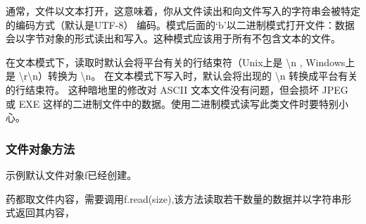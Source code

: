 \documentclass[UTF8]{ctexart}
\begin{document}
通常，文件以文本打开，这意味着，你从文件读出和向文件写入的字符串会被特定的编码方式（默认是UTF-8）
编码。模式后面的`b'以二进制模式打开文件：数据会以字节对象的形式读出和写入。这种模式应该用于所有不包含文本的文件。

在文本模式下，读取时默认会将平台有关的行结束符（Unix上是 \textbackslash n , Windows上是 \textbackslash r\textbackslash n）转换为 \textbackslash n。
在文本模式下写入时，默认会将出现的 \textbackslash n 转换成平台有关的行结束符。
这种暗地里的修改对 ASCII 文本文件没有问题，但会损坏 JPEG 或 EXE 这样的二进制文件中的数据。使用二进制模式读写此类文件时要特别小心。

\subsubsection{文件对象方法}
示例默认文件对象f已经创建。

药都取文件内容，需要调用f.read(size),该方法读取若干数量的数据并以字符串形式返回其内容，
\end{document}

